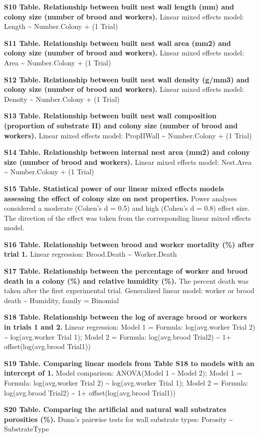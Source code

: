 \documentclass[3p]{elsarticle} %
\begin{document}
\textbf{S10 Table. Relationship between built nest wall length (mm) and
colony size (number of brood and workers).} Linear mixed effects model:
Length \textasciitilde{} Number.Colony + (1 \textbar{} Trial)

\textbf{S11 Table. Relationship between built nest wall area (mm2) and
colony size (number of brood and workers).} Linear mixed effects model:
Area \textasciitilde{} Number.Colony + (1 \textbar{} Trial)

\textbf{S12 Table. Relationship between built nest wall density (g/mm3)
and colony size (number of brood and workers).} Linear mixed effects
model: Density \textasciitilde{} Number.Colony + (1 \textbar{} Trial)

\textbf{S13 Table. Relationship between built nest wall composition
(proportion of substrate II) and colony size (number of brood and
workers).} Linear mixed effects model: PropIIWall \textasciitilde{}
Number.Colony + (1 \textbar{} Trial)

\textbf{S14 Table. Relationship between internal nest area (mm2) and
colony size (number of brood and workers).} Linear mixed effects model:
Nest.Area \textasciitilde{} Number.Colony + (1 \textbar{} Trial)

\textbf{S15 Table. Statistical power of our linear mixed effects models
assessing the effect of colony size on nest properties.} Power analyses
considered a moderate (Cohen's d = 0.5) and high (Cohen's d = 0.8)
effect size. The direction of the effect was taken from the
corresponding linear mixed effects model.

\textbf{S16 Table. Relationship between brood and worker mortality (\%)
after trial 1.} Linear regression: Brood.Death \textasciitilde{}
Worker.Death

\textbf{S17 Table. Relationship between the percentage of worker and
brood death in a colony (\%) and relative humidity (\%).} The percent
death was taken after the first experimental trial. Generalized linear
model: worker or brood death \textasciitilde{} Humidity, family =
Binomial

\textbf{S18 Table. Relationship between the log of average brood or
workers in trials 1 and 2.} Linear regression: Model 1 = Formula:
log(avg.worker Trial 2) \textasciitilde{} log(avg.worker Trial 1); Model
2 = Formula: log(avg.brood Trial2) \textasciitilde{} 1+
offset(log(avg.brood Trial1))

\textbf{S19 Table. Comparing linear models from Table S18 to models with
an intercept of 1.} Model comparison: ANOVA(Model 1 \textasciitilde{}
Model 2); Model 1 = Formula: log(avg.worker Trial 2) \textasciitilde{}
log(avg.worker Trial 1); Model 2 = Formula: log(avg.brood Trial2)
\textasciitilde{} 1+ offset(log(avg.brood Trial1))

\textbf{S20 Table. Comparing the artificial and natural wall substrates
porosities (\%).} Dunn's pairwise tests for wall substrate types:
Porosity \textasciitilde{} SubstrateType
\end{document}
